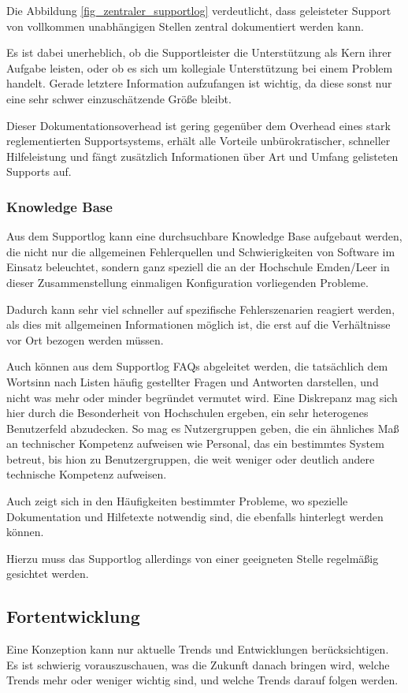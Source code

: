 Die Abbildung \ref{fig_zentraler_supportlog} verdeutlicht, dass geleisteter Support von vollkommen unabhängigen Stellen zentral dokumentiert werden kann.

Es ist dabei unerheblich, ob die Supportleister die Unterstützung als Kern ihrer Aufgabe 
leisten, oder ob es sich um kollegiale Unterstützung bei einem Problem handelt. Gerade 
letztere Information aufzufangen ist wichtig, da diese sonst nur eine sehr schwer 
einzuschätzende Größe bleibt.

Dieser Dokumentationsoverhead ist gering gegenüber dem Overhead eines stark 
reglementierten Supportsystems, erhält alle Vorteile unbürokratischer, schneller 
Hilfeleistung und fängt zusätzlich Informationen über Art und Umfang gelisteten Supports 
auf.

\subsubsection{Knowledge Base}
Aus dem Supportlog kann eine durchsuchbare Knowledge Base aufgebaut werden, die nicht 
nur die allgemeinen Fehlerquellen und Schwierigkeiten von Software im Einsatz beleuchtet, 
sondern ganz speziell die an der Hochschule Emden/Leer in dieser Zusammenstellung 
einmaligen Konfiguration vorliegenden Probleme.

Dadurch kann sehr viel schneller auf spezifische Fehlerszenarien reagiert werden, als dies 
mit allgemeinen Informationen möglich ist, die erst auf die Verhältnisse vor Ort bezogen 
werden müssen.

Auch können aus dem Supportlog FAQs abgeleitet werden, die tatsächlich dem Wortsinn 
nach Listen häufig gestellter Fragen und Antworten darstellen, und nicht was mehr oder 
minder begründet vermutet wird. Eine Diskrepanz mag sich hier durch die Besonderheit von 
Hochschulen ergeben, ein sehr heterogenes Benutzerfeld abzudecken. So mag es 
Nutzergruppen geben, die ein ähnliches Maß an technischer Kompetenz aufweisen wie 
Personal, das ein bestimmtes System betreut, bis hion zu Benutzergruppen, die weit weniger 
oder deutlich andere technische Kompetenz aufweisen.

Auch zeigt sich in den Häufigkeiten bestimmter Probleme, wo spezielle Dokumentation und 
Hilfetexte notwendig sind, die ebenfalls hinterlegt werden können.

Hierzu muss das Supportlog allerdings von einer geeigneten Stelle regelmäßig gesichtet 
werden.

\subsection{Fortentwicklung}
Eine Konzeption kann nur aktuelle Trends und Entwicklungen berücksichtigen. Es ist 
schwierig vorauszuschauen, was die Zukunft danach bringen wird, welche Trends mehr oder 
weniger wichtig sind, und welche Trends darauf folgen werden.

